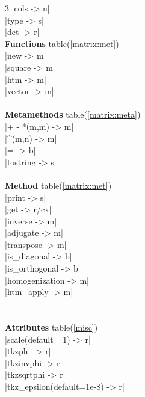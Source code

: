 \documentclass[DIV         = 14,
               fontsize    = 10,
               index       = totoc,
               twoside,
               cadre,
               headings    = small
               ]{tkz-doc}
\begin{document}
\begin{multicols}{3}
|cols                      ->  n|  \\
|type                      ->  s|  \\
|det                       ->  r|  \\
\textbf{Functions} table(\ref{matrix:met}) \\
|new                       ->  m|  \\
|square                    ->  m|  \\
|htm                       ->  m|  \\
|vector                    ->  m|  \\
\\
\textbf{Metamethods} table(\ref{matrix:meta}) \\
|+ - *(m,m)                 -> m|   \\
|^(m,n)                     -> m|   \\
|=                          -> b|   \\
|tostring                   -> s|   \\
\\
\textbf{Method} table(\ref{matrix:met})   \\
|print                      -> s|   \\                    
|get                     -> r/cx|   \\
|inverse                    -> m|   \\    
|adjugate                   -> m|   \\ 
|transpose                  -> m|   \\   
|is_diagonal                -> b|   \\   
|is_orthogonal              -> b|   \\  
|homogenization             -> m|   \\  
|htm_apply                  -> m|   \\  
                                    \\                       
               \\
 \textbf{Attributes} table(\ref{misc}) \\
|scale(default =1)          -> r|   \\ 
|tkzphi                     -> r|   \\
|tkzinvphi                  -> r|   \\
|tkzsqrtphi                 -> r|   \\
|tkz_epsilon(default=1e-8)  -> r|   \\

\end{multicols}
\end{document}
